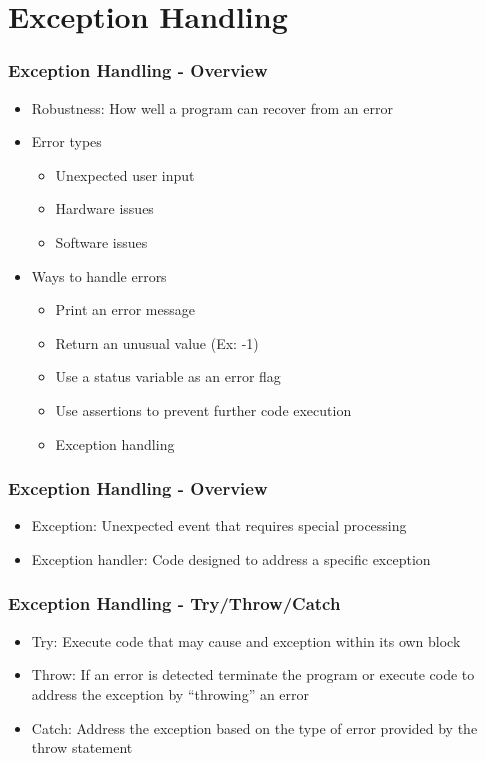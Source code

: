 \documentclass[c, aspectratio=169]{beamer}
\begin{document}
\section{Exception Handling}
\begin{frame}\frametitle{Exception Handling - Overview}
\begin{itemize}
\item Robustness: How well a program can recover from an error
\item Error types
	\begin{itemize}
	\item Unexpected user input
	\item Hardware issues
	\item Software issues
	\end{itemize}
\item Ways to handle errors
	\begin{itemize}
	\item Print an error message
	\item Return an unusual value (Ex: -1)
	\item Use a status variable as an error flag
	\item Use assertions to prevent further code execution
	\item Exception handling
	\end{itemize}
\end{itemize}
\end{frame}

\begin{frame}\frametitle{Exception Handling - Overview}
\begin{itemize}
\item Exception: Unexpected event that requires special processing
\item Exception handler: Code designed to address a specific exception
\end{itemize}
\end{frame}

\begin{frame}\frametitle{Exception Handling - Try/Throw/Catch}
\begin{itemize}
\item Try: Execute code that may cause and exception within its own block
\item Throw: If an error is detected terminate the program or execute code to address the exception by ``throwing'' an error
\item Catch: Address the exception based on the type of error provided by the throw statement
\end{itemize}
\end{frame}
\end{document}

